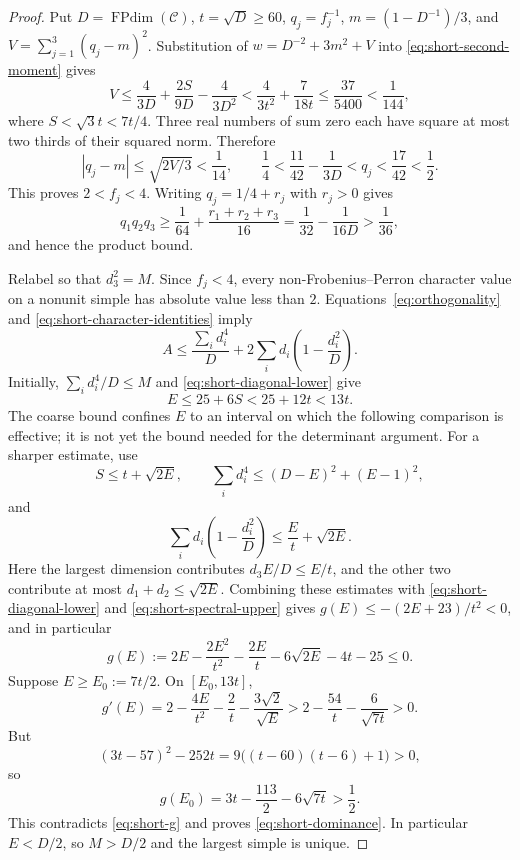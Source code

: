 \documentclass[11pt]{amsart}
\theoremstyle{definition}
\DeclareMathOperator{\FPdim}{FPdim}
\numberwithin{equation}{section}
\begin{document}
\begin{proof}
Put $D=\FPdim(\mathcal C)$, $t=\sqrt D\geq60$, $q_j=f_j^{-1}$,
$m=(1-D^{-1})/3$, and $V=\sum_{j=1}^3(q_j-m)^2$.
Substitution of $w=D^{-2}+3m^2+V$ into
\eqref{eq:short-second-moment} gives
\[
 V\leq\frac4{3D}+\frac{2S}{9D}-\frac4{3D^2}
 <\frac4{3t^2}+\frac7{18t}\leq\frac{37}{5400}<\frac1{144},
\]
where $S<\sqrt3t<7t/4$.
Three real numbers of sum zero each have square at most two thirds of
their squared norm. Therefore
\[
 |q_j-m|\leq\sqrt{2V/3}<\frac1{14},\qquad
 \frac14<\frac{11}{42}-\frac1{3D}<q_j
 <\frac{17}{42}<\frac12.
\]
This proves $2<f_j<4$. Writing $q_j=1/4+r_j$ with $r_j>0$ gives
\[
 q_1q_2q_3
 \geq\frac1{64}+\frac{r_1+r_2+r_3}{16}
 =\frac1{32}-\frac1{16D}>\frac1{36},
\]
and hence the product bound.

Relabel so that $d_3^2=M$. Since $f_j<4$, every non-Frobenius--Perron
character value on a nonunit simple has absolute value less than $2$.
Equations~\eqref{eq:orthogonality} and \eqref{eq:short-character-identities} imply
\begin{equation}\label{eq:short-spectral-upper}
 A\leq\frac{\sum_i d_i^4}{D}
    +2\sum_i d_i\left(1-\frac{d_i^2}{D}\right).
\end{equation}
Initially, $\sum_i d_i^4/D\leq M$ and
\eqref{eq:short-diagonal-lower} give
\begin{equation}\label{eq:short-coarse-dominance}
 E\leq25+6S<25+12t<13t.
\end{equation}
The coarse bound confines $E$ to an interval on which the following
comparison is effective; it is not yet the bound needed for the
determinant argument. For a sharper estimate, use
\[
 S\leq t+\sqrt{2E},\qquad
 \sum_i d_i^4\leq(D-E)^2+(E-1)^2,
\]
and
\[
 \sum_i d_i\left(1-\frac{d_i^2}{D}\right)
 \leq\frac{E}{t}+\sqrt{2E}.
\]
Here the largest dimension contributes $d_3E/D\leq E/t$, and the
other two contribute at most $d_1+d_2\leq\sqrt{2E}$.
Combining these estimates with \eqref{eq:short-diagonal-lower} and
\eqref{eq:short-spectral-upper} gives $g(E)\leq-(2E+23)/t^2<0$, and in particular
\begin{equation}\label{eq:short-g}
 g(E):=2E-\frac{2E^2}{t^2}-\frac{2E}{t}
              -6\sqrt{2E}-4t-25\leq0.
\end{equation}
Suppose $E\geq E_0:=7t/2$. On $[E_0,13t]$,
\[
 g'(E)=2-\frac{4E}{t^2}-\frac2t-\frac{3\sqrt2}{\sqrt E}
 >2-\frac{54}{t}-\frac6{\sqrt{7t}}>0.
\]
But
\[
 (3t-57)^2-252t=9\bigl((t-60)(t-6)+1\bigr)>0,
\]
so
\[
 g(E_0)=3t-\frac{113}{2}-6\sqrt{7t}>\frac12.
\]
This contradicts \eqref{eq:short-g} and proves
\eqref{eq:short-dominance}. In particular $E<D/2$, so $M>D/2$ and
the largest simple is unique.


\end{proof}
\end{document}
